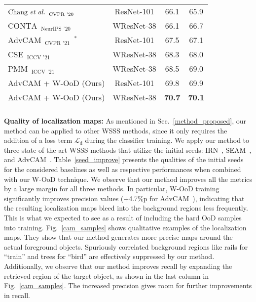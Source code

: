 \documentclass[10pt,twocolumn,letterpaper]{article}
\begin{document}
\begin{table}[t]
\begin{threeparttable}
\begin{tabular}{l@{\hskip 0.1in}c@{\hskip 0.1in}cc}
    $\text{Chang \textit{et al.}}_{\text{~~CVPR '20}}$~\cite{chang2020weakly}   & ResNet-101  & 66.1  & 65.9\\


    $\text{CONTA}_{\text{~~NeurIPS '20}}$~\cite{zhang2020causal}   & WResNet-38  & 66.1  & 66.7  \\

    $\text{AdvCAM}_{\text{~~CVPR '21}}$~\cite{lee2021anti}$^*$ & ResNet-101 & 67.5 & 67.1  \\
    $\text{CSE}_{\text{~~ICCV '21}}$~\cite{kweon2021unlocking} & WResNet-38 & 68.3 & 68.0  \\


    $\text{PMM}_{\text{~~ICCV '21}}$~\cite{li2021pseudo} & WResNet-38 & 68.5 & 69.0  \\
        AdvCAM + W-OoD (Ours) & ResNet-101 &  69.8 &  69.9 \\

    AdvCAM + W-OoD (Ours) & WResNet-38 & \textbf{70.7} & \textbf{70.1}  \\
\Xhline{1pt}
    
    \end{tabular}\end{threeparttable}
\vspace{-1em}

      \end{table} 

\textbf{Quality of localization maps:}
As mentioned in Sec.~\ref{method_proposed}, our method can be applied to other WSSS methods, since it only requires the addition of a loss term $\mathcal{L}_\text{d}$ during the classifier training.
We apply our method to three state-of-the-art WSSS methods that utilize the initial seeds: IRN~\cite{ahn2019weakly}, SEAM~\cite{wang2020self}, and AdvCAM~\cite{lee2021anti}.
Table~\ref{seed_improve} presents the qualities of the initial seeds for the considered baselines as well as respective performances when combined with our W-OoD technique. We observe that our method improves all the metrics by a large margin for all three methods. 
In particular, W-OoD training significantly improves precision values (\eg +4.7\%p for AdvCAM~\cite{lee2021anti}), indicating that the resulting localization maps bleed into the background regions less frequently. This is what we expected to see as a result of including the hard OoD samples into training.
Fig.~\ref{cam_samples} shows qualitative examples of the localization maps. 
They show that our method generates more precise maps around the actual foreground objects. Spuriously correlated background regions like rails for ``train'' and trees for ``bird'' are effectively suppressed by our method.
Additionally, we observe that our method improves recall by expanding the retrieved region of the target object, as shown in the last column in Fig.~\ref{cam_samples}. 
The increased precision gives room for further improvements in recall.
\end{document}
